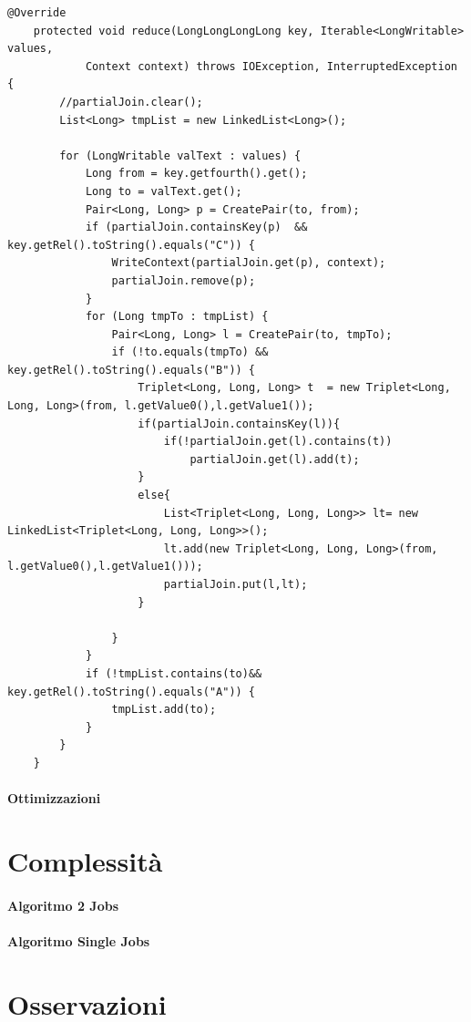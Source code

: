 \documentclass[paper=a4, fontsize=11pt]{scrartcl}	%
\numberwithin{equation}{section}															%
\numberwithin{figure}{section}																%
\numberwithin{table}{section}																%
\begin{document}
\begin{lstlisting}[label=Reducer,caption=Implementazione del Reducer single Job]
	@Override
	protected void reduce(LongLongLongLong key, Iterable<LongWritable> values,
			Context context) throws IOException, InterruptedException {
		//partialJoin.clear();
		List<Long> tmpList = new LinkedList<Long>();

		for (LongWritable valText : values) {
			Long from = key.getfourth().get();
			Long to = valText.get();
			Pair<Long, Long> p = CreatePair(to, from);
			if (partialJoin.containsKey(p)	&& key.getRel().toString().equals("C")) {
				WriteContext(partialJoin.get(p), context);
				partialJoin.remove(p);
			}
			for (Long tmpTo : tmpList) {
				Pair<Long, Long> l = CreatePair(to, tmpTo);
				if (!to.equals(tmpTo) && key.getRel().toString().equals("B")) {
					Triplet<Long, Long, Long> t  = new Triplet<Long, Long, Long>(from, l.getValue0(),l.getValue1());
					if(partialJoin.containsKey(l)){
						if(!partialJoin.get(l).contains(t))
							partialJoin.get(l).add(t);
					}
					else{
						List<Triplet<Long, Long, Long>> lt= new LinkedList<Triplet<Long, Long, Long>>();
						lt.add(new Triplet<Long, Long, Long>(from, l.getValue0(),l.getValue1()));						
						partialJoin.put(l,lt);						
					}
						
				}
			}
			if (!tmpList.contains(to)&& key.getRel().toString().equals("A")) {
				tmpList.add(to);
			}
		}
	}
\end{lstlisting}

\paragraph{Ottimizzazioni}


\section{Complessit\`a}
\paragraph{Algoritmo 2 Jobs}
\paragraph{Algoritmo Single Jobs}


\section{Osservazioni}
\end{document}
